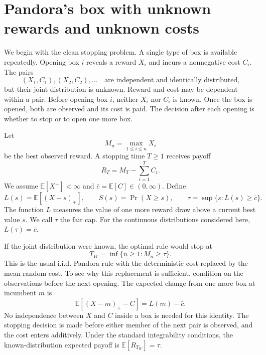 \section{Pandora's box with unknown rewards and unknown costs}
\label{sec:model}

We begin with the clean stopping problem.  A single type of box is available
repeatedly.  Opening box $i$ reveals a reward $X_i$ and incurs a nonnegative
cost $C_i$.  The pairs
\begin{equation}
  (X_1,C_1),(X_2,C_2),\ldots
  \quad\text{are independent and identically distributed,}
  \label{eq:iid-pairs}
\end{equation}
but their joint distribution is unknown.  Reward and cost may be dependent
within a pair.  Before opening box $i$, neither $X_i$ nor $C_i$ is known.  Once
the box is opened, both are observed and its cost is paid.  The decision after
each opening is whether to stop or to open one more box.

Let
\begin{equation}
  M_n=\max_{1\le i\le n}X_i
\end{equation}
be the best observed reward.  A stopping time $T\ge1$ receives payoff
\begin{equation}
  R_T=M_T-\sum_{i=1}^{T}C_i.
  \label{eq:random-cost-objective}
\end{equation}
We assume $\mathbb E[X^+]<\infty$ and
$\bar c=\mathbb E[C]\in(0,\infty)$.  Define
\begin{equation}
  L(s)=\mathbb E[(X-s)_+],
  \qquad S(s)=\Pr(X\ge s),
  \qquad
  \tau=\sup\{s:L(s)\ge\bar c\}.
  \label{eq:random-cost-cap}
\end{equation}
The function $L$ measures the value of one more reward draw above a current
best value $s$.  We call $\tau$ the fair cap.  For the continuous
distributions considered here, $L(\tau)=\bar c$.

If the joint distribution were known, the optimal rule would stop at
\begin{equation}
  T_W=\inf\{n\ge1:M_n\ge\tau\}.
  \label{eq:oracle-stop}
\end{equation}
This is the usual i.i.d. Pandora rule with the deterministic cost replaced by
the mean random cost.  To see why this replacement is sufficient, condition
on the observations before the next opening.  The expected change from one
more box at incumbent $m$ is
\begin{equation}
  \mathbb E[(X-m)_+-C]=L(m)-\bar c.
  \label{eq:one-step-random-cost}
\end{equation}
No independence between $X$ and $C$ inside a box is needed for this identity.
The stopping decision is made before either member of the next pair is
observed, and the cost enters additively.  Under the standard integrability
conditions, the known-distribution expected payoff is
$\mathbb E[R_{T_W}]=\tau$.


